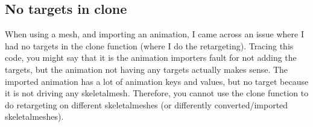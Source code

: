\documentclass{uva-inf-article}
\begin{document}
\subsection{No targets in clone}
When using a mesh, and importing an animation, I came across an issue where I had no targets in the clone function (where I do the retargeting). Tracing this code, you might say that it is the animation importers fault for not adding the targets, but the animation not having any targets actually makes sense. The imported animation has a lot of animation keys and values, but no target because it is not driving any skeletalmesh. Therefore, you cannot use the clone function to do retargeting on different skeletalmeshes (or differently converted/imported skeletalmeshes).


\printbibliography



\end{document}
